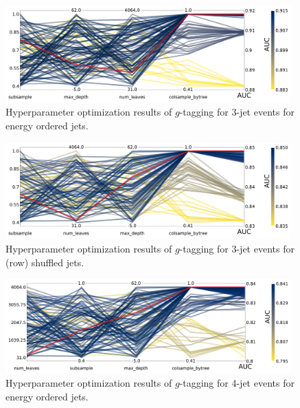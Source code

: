 \begin{figure}[h!]
  \includegraphics[width=0.98\textwidth, trim=0 0 0 0, clip]{figures/quarks/CV_viz-njet=3-name=lf_gtag_energy_ordered_lgb_down_sample=1.00-ML_vars=vertex-selection=b-ejet_min=4-n_iter_RS_lgb=99-n_iter_RS_xgb=9-cdot_cut=0.90-version=19.pdf}
  \caption[Parallel Plot of HPO Results for 3-Jet $g$-Tagging for Energy Ordered Jets]
          {Hyperparameter optimization results of $g$-tagging for 3-jet events for energy ordered jets. 
          } 
  \label{fig:q:CV_res_parallel_coords_g_tag_3j_energy_ordered}
\end{figure}


\begin{figure}[h!]
  \includegraphics[width=0.98\textwidth, trim=0 0 0 0, clip]{figures/quarks/CV_viz-njet=3-name=lf_gtag_shuffled_lgb_down_sample=1.00-ML_vars=vertex-selection=b-ejet_min=4-n_iter_RS_lgb=99-n_iter_RS_xgb=9-cdot_cut=0.90-version=19.pdf}
  \caption[Parallel Plot of HPO Results for 3-Jet $g$-Tagging for Shuffled Jets]
          {Hyperparameter optimization results of $g$-tagging for 3-jet events for (row) shuffled jets. 
          } 
  \label{fig:q:CV_res_parallel_coords_g_tag_3j_shuffled}
\end{figure}

\begin{figure}[h!]
  \includegraphics[width=0.98\textwidth, trim=0 0 0 0, clip]{figures/quarks/CV_viz-njet=4-name=lf_gtag_energy_ordered_lgb_down_sample=1.00-ML_vars=vertex-selection=b-ejet_min=4-n_iter_RS_lgb=99-n_iter_RS_xgb=9-cdot_cut=0.90-version=19.pdf}
  \caption[Parallel Plot of HPO Results for 4-Jet $g$-Tagging for Energy Ordered Jets]
          {Hyperparameter optimization results of $g$-tagging for 4-jet events for energy ordered jets. 
          } 
  \label{fig:q:CV_res_parallel_coords_g_tag_4j_energy_ordered}
\end{figure}



